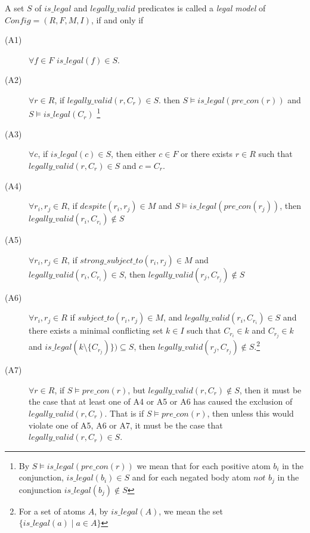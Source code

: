 A set $S$ of $is\_legal$ and $legally\_valid$ predicates is called a \textit{legal model} of $Config = (R,F,M,I)$, if and only if
\begin{description}
\item[(A1)]$\forall f \in F$ $is\_legal(f) \in S$.

\item[(A2)] $\forall r \in R$, if $legally\_valid(r,C_{r}) \in S$. then $S\models is\_legal(pre\_con(r))$ and $S\models is\_legal(C_{r})$ \footnote{By $S\models is\_legal(pre\_con(r))$ we mean that for each positive atom $b_{i}$ in the conjunction, $is\_legal(b_{i}) \in S$ and for each negated body atom $not$ $b_{j}$ in the conjunction $is\_legal(b_{j})\notin S$ }

\item[(A3)] $\forall c$, if $is\_legal(c) \in S$, then either $c\in F$ or there exists $r \in R$ such that $legally\_valid(r,C_{r}) \in S$ and $c= C_{r}$.

\item[(A4)] $\forall r_{i}, r_{j} \in R$, if $despite(r_{i}, r_{j}) \in M$ and $S\models is\_legal(pre\_con(r_{j}))$, then $legally\_valid(r_{i},C_{r_{i}}) \notin S$

\item[(A5)] $\forall r_{i}, r_{j} \in R$, if $strong\_subject\_to(r_{i}, r_{j}) \in M$ and $legally\_valid(r_{i},C_{r_{i}}) \in S$, then $legally\_valid(r_{j},C_{r_{j}}) \notin S$

\item[(A6)] $\forall r_{i},r_{j} \in R$ if $subject\_to(r_{i},r_{j}) \in M$, and $legally\_valid(r_{i},C_{r_{i}}) \in S$ and there exists a minimal conflicting set $k \in I$ such that $C_{r_{i}} \in k$ and $C_{r_{j}}\in k$ and $is\_legal(k\setminus \{C_{r_{j}})\})\subseteq S $, then $legally\_valid(r_{j},C_{r_{j}}) \notin S$.\footnote{For a set of atoms $A$, by $is\_legal(A)$, we mean the set $\{is\_legal(a)\mid a\in A\}$}

\item[(A7)] $\forall r\in R$, if $S\models pre\_con(r)$, but $legally\_valid(r,C_{r})\notin S$, then it must be the case that at least one of A4 or A5 or A6 has caused the exclusion of $legally\_valid(r,C_{r})$. That is if $S\models pre\_con(r)$, then unless this would violate one of A5, A6 or A7, it must be the case that $legally\_valid(r,C_{r})\in S$.
\end{description}

